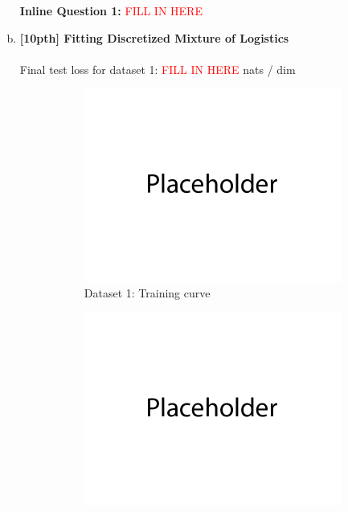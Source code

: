 \documentclass{article}
\begin{document}
\begin{enumerate}[(a)]
\textbf{Inline Question 1:} \textcolor{red}{FILL IN HERE}



\newpage

\item {\bf [10pth] Fitting Discretized Mixture of Logistics} \\\\
Final test loss for dataset 1: \textcolor{red}{FILL IN HERE}  nats / dim
\begin{figure}[H]
    \centering
    \begin{subfigure}{0.45\textwidth}
        \centering
        \includegraphics[width=\textwidth]{figures/placeholder.png}
        \caption{Dataset 1: Training curve}
    \end{subfigure}
    \hspace{0.2in}
    \begin{subfigure}{0.45\textwidth}
        \centering
        \includegraphics[width=\textwidth]{figures/placeholder.png}

\end{subfigure}
\end{figure}
\end{enumerate}
\end{document}
